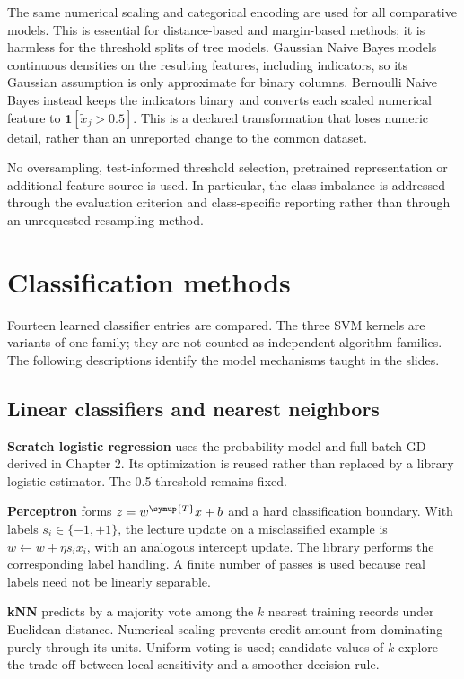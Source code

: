 The same numerical scaling and categorical encoding are used for all comparative models. This is essential for distance-based and margin-based methods; it is harmless for the threshold splits of tree models. Gaussian Naive Bayes models continuous densities on the resulting features, including indicators, so its Gaussian assumption is only approximate for binary columns. Bernoulli Naive Bayes instead keeps the indicators binary and converts each scaled numerical feature to $\mathbf1[\tilde x_j>0.5]$. This is a declared transformation that loses numeric detail, rather than an unreported change to the common dataset.

No oversampling, test-informed threshold selection, pretrained representation or additional feature source is used. In particular, the class imbalance is addressed through the evaluation criterion and class-specific reporting rather than through an unrequested resampling method.


\section{Classification methods}
Fourteen learned classifier entries are compared. The three SVM kernels are variants of one family; they are not counted as independent algorithm families. The following descriptions identify the model mechanisms taught in the slides.

\subsection{Linear classifiers and nearest neighbors}
\textbf{Scratch logistic regression} uses the probability model and full-batch GD derived in Chapter 2. Its optimization is reused rather than replaced by a library logistic estimator. The 0.5 threshold remains fixed.

\textbf{Perceptron} forms $z=w^{\symup{T}}x+b$ and a hard classification boundary. With labels $s_i\in\{-1,+1\}$, the lecture update on a misclassified example is $w\leftarrow w+\eta s_ix_i$, with an analogous intercept update. The library performs the corresponding label handling. A finite number of passes is used because real labels need not be linearly separable.

\textbf{kNN} predicts by a majority vote among the $k$ nearest training records under Euclidean distance. Numerical scaling prevents credit amount from dominating purely through its units. Uniform voting is used; candidate values of $k$ explore the trade-off between local sensitivity and a smoother decision rule.

